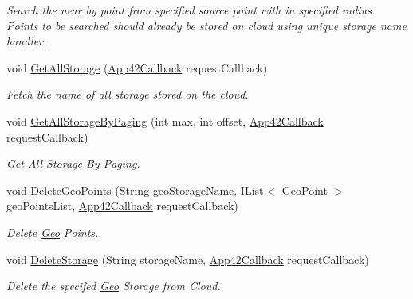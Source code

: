 \begin{DoxyCompactItemize}
\begin{DoxyCompactList}\small\item\em Search the near by point from specified source point with in specified radius. Points to be searched should already be stored on cloud using unique storage name handler. \end{DoxyCompactList}\item 
void \hyperlink{classcom_1_1shephertz_1_1app42_1_1paas_1_1sdk_1_1windows_1_1geo_1_1_geo_service_a3546491901cec838ee216732de4c40ef}{Get\+All\+Storage} (\hyperlink{interfacecom_1_1shephertz_1_1app42_1_1paas_1_1sdk_1_1windows_1_1_app42_callback}{App42\+Callback} request\+Callback)
\begin{DoxyCompactList}\small\item\em Fetch the name of all storage stored on the cloud. \end{DoxyCompactList}\item 
void \hyperlink{classcom_1_1shephertz_1_1app42_1_1paas_1_1sdk_1_1windows_1_1geo_1_1_geo_service_a38c5586d721887ed5b4ffe0f058ff6b5}{Get\+All\+Storage\+By\+Paging} (int max, int offset, \hyperlink{interfacecom_1_1shephertz_1_1app42_1_1paas_1_1sdk_1_1windows_1_1_app42_callback}{App42\+Callback} request\+Callback)
\begin{DoxyCompactList}\small\item\em Get All Storage By Paging. \end{DoxyCompactList}\item 
void \hyperlink{classcom_1_1shephertz_1_1app42_1_1paas_1_1sdk_1_1windows_1_1geo_1_1_geo_service_a92a68755ede9fd55a9885a3718a6a856}{Delete\+Geo\+Points} (String geo\+Storage\+Name, I\+List$<$ \hyperlink{classcom_1_1shephertz_1_1app42_1_1paas_1_1sdk_1_1windows_1_1geo_1_1_geo_point}{Geo\+Point} $>$ geo\+Points\+List, \hyperlink{interfacecom_1_1shephertz_1_1app42_1_1paas_1_1sdk_1_1windows_1_1_app42_callback}{App42\+Callback} request\+Callback)
\begin{DoxyCompactList}\small\item\em Delete \hyperlink{classcom_1_1shephertz_1_1app42_1_1paas_1_1sdk_1_1windows_1_1geo_1_1_geo}{Geo} Points. \end{DoxyCompactList}\item 
void \hyperlink{classcom_1_1shephertz_1_1app42_1_1paas_1_1sdk_1_1windows_1_1geo_1_1_geo_service_abe596b7470b1ff1b62b4a69aeae6ef96}{Delete\+Storage} (String storage\+Name, \hyperlink{interfacecom_1_1shephertz_1_1app42_1_1paas_1_1sdk_1_1windows_1_1_app42_callback}{App42\+Callback} request\+Callback)
\begin{DoxyCompactList}\small\item\em Delete the specifed \hyperlink{classcom_1_1shephertz_1_1app42_1_1paas_1_1sdk_1_1windows_1_1geo_1_1_geo}{Geo} Storage from Cloud. \end{DoxyCompactList}\item 

\end{DoxyCompactItemize}
